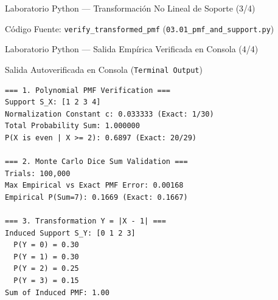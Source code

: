 \documentclass[10pt, aspectratio=169]{beamer}
\begin{document}
\begin{frame}[fragile]{Laboratorio Python — Transformación No Lineal de Soporte (3/4)}
  \begin{block}{Código Fuente: \texttt{verify\_transformed\_pmf} (\texttt{03.01\_pmf\_and\_support.py})}
    \fontsize{6pt}{7pt}\selectfont
    
  \end{block}
\end{frame}

\begin{frame}[fragile]{Laboratorio Python — Salida Empírica Verificada en Consola (4/4)}
  \begin{block}{Salida Autoverificada en Consola (\texttt{Terminal Output})}
    \fontsize{6.5pt}{7.5pt}\selectfont
\begin{verbatim}
=== 1. Polynomial PMF Verification ===
Support S_X: [1 2 3 4]
Normalization Constant c: 0.033333 (Exact: 1/30)
Total Probability Sum: 1.000000
P(X is even | X >= 2): 0.6897 (Exact: 20/29)

=== 2. Monte Carlo Dice Sum Validation ===
Trials: 100,000
Max Empirical vs Exact PMF Error: 0.00168
Empirical P(Sum=7): 0.1669 (Exact: 0.1667)

=== 3. Transformation Y = |X - 1| ===
Induced Support S_Y: [0 1 2 3]
  P(Y = 0) = 0.30
  P(Y = 1) = 0.30
  P(Y = 2) = 0.25
  P(Y = 3) = 0.15
Sum of Induced PMF: 1.00
\end{verbatim}
  \end{block}
\end{frame}
\end{document}

